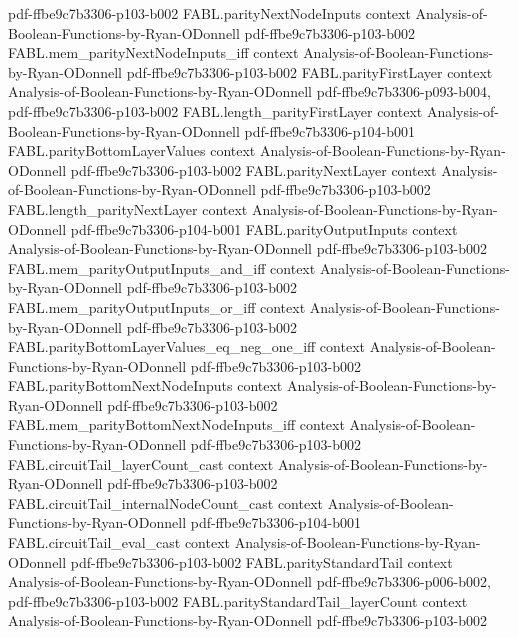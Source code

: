 \begin{theorem}
  {pdf-ffbe9c7b3306-p103-b002}
\proofstep
  {FABL.parityNextNodeInputs}
  {context}
  {Analysis-of-Boolean-Functions-by-Ryan-ODonnell}
  {pdf-ffbe9c7b3306-p103-b002}
\proofstep
  {FABL.mem_parityNextNodeInputs_iff}
  {context}
  {Analysis-of-Boolean-Functions-by-Ryan-ODonnell}
  {pdf-ffbe9c7b3306-p103-b002}
\proofstep
  {FABL.parityFirstLayer}
  {context}
  {Analysis-of-Boolean-Functions-by-Ryan-ODonnell}
  {pdf-ffbe9c7b3306-p093-b004,
    pdf-ffbe9c7b3306-p103-b002}
\proofstep
  {FABL.length_parityFirstLayer}
  {context}
  {Analysis-of-Boolean-Functions-by-Ryan-ODonnell}
  {pdf-ffbe9c7b3306-p104-b001}
\proofstep
  {FABL.parityBottomLayerValues}
  {context}
  {Analysis-of-Boolean-Functions-by-Ryan-ODonnell}
  {pdf-ffbe9c7b3306-p103-b002}
\proofstep
  {FABL.parityNextLayer}
  {context}
  {Analysis-of-Boolean-Functions-by-Ryan-ODonnell}
  {pdf-ffbe9c7b3306-p103-b002}
\proofstep
  {FABL.length_parityNextLayer}
  {context}
  {Analysis-of-Boolean-Functions-by-Ryan-ODonnell}
  {pdf-ffbe9c7b3306-p104-b001}
\proofstep
  {FABL.parityOutputInputs}
  {context}
  {Analysis-of-Boolean-Functions-by-Ryan-ODonnell}
  {pdf-ffbe9c7b3306-p103-b002}
\proofstep
  {FABL.mem_parityOutputInputs_and_iff}
  {context}
  {Analysis-of-Boolean-Functions-by-Ryan-ODonnell}
  {pdf-ffbe9c7b3306-p103-b002}
\proofstep
  {FABL.mem_parityOutputInputs_or_iff}
  {context}
  {Analysis-of-Boolean-Functions-by-Ryan-ODonnell}
  {pdf-ffbe9c7b3306-p103-b002}
\proofstep
  {FABL.parityBottomLayerValues_eq_neg_one_iff}
  {context}
  {Analysis-of-Boolean-Functions-by-Ryan-ODonnell}
  {pdf-ffbe9c7b3306-p103-b002}
\proofstep
  {FABL.parityBottomNextNodeInputs}
  {context}
  {Analysis-of-Boolean-Functions-by-Ryan-ODonnell}
  {pdf-ffbe9c7b3306-p103-b002}
\proofstep
  {FABL.mem_parityBottomNextNodeInputs_iff}
  {context}
  {Analysis-of-Boolean-Functions-by-Ryan-ODonnell}
  {pdf-ffbe9c7b3306-p103-b002}
\proofstep
  {FABL.circuitTail_layerCount_cast}
  {context}
  {Analysis-of-Boolean-Functions-by-Ryan-ODonnell}
  {pdf-ffbe9c7b3306-p103-b002}
\proofstep
  {FABL.circuitTail_internalNodeCount_cast}
  {context}
  {Analysis-of-Boolean-Functions-by-Ryan-ODonnell}
  {pdf-ffbe9c7b3306-p104-b001}
\proofstep
  {FABL.circuitTail_eval_cast}
  {context}
  {Analysis-of-Boolean-Functions-by-Ryan-ODonnell}
  {pdf-ffbe9c7b3306-p103-b002}
\proofstep
  {FABL.parityStandardTail}
  {context}
  {Analysis-of-Boolean-Functions-by-Ryan-ODonnell}
  {pdf-ffbe9c7b3306-p006-b002,
    pdf-ffbe9c7b3306-p103-b002}
\proofstep
  {FABL.parityStandardTail_layerCount}
  {context}
  {Analysis-of-Boolean-Functions-by-Ryan-ODonnell}
  {pdf-ffbe9c7b3306-p103-b002}

\end{theorem}

